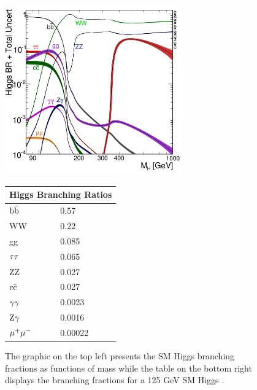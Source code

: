 \begin{figure}[h!]
  \centering
  \includegraphics[width=3in]{images/Higgs_BR.png}
  \begin{tabular}{ |l|l| }
    \hline
    \multicolumn{2}{|c|}{Higgs Branching Ratios} \\
    \hline
    ${\rm b\bar{b}}$ & 0.57 \\
    WW & 0.22\\
    gg & 0.085 \\
    ${\rm \tau\tau}$ & 0.065 \\
    ZZ & 0.027 \\
    ${\rm c\bar{c}}$ & 0.027 \\
    ${\rm \gamma\gamma}$ & 0.0023 \\
    ${\rm Z}\gamma$ & 0.0016 \\
    ${\rm \mu^{+}\mu^{-}}$ & 0.00022 \\
    \hline
  \end{tabular} 
  \caption
{The graphic on the top left presents the SM Higgs branching fractions as functions of mass while the table on the bottom right displays the branching fractions for a 125 GeV SM Higgs \cite{crossbranchplots}.}
  \label{fig:hbranch}
\end{figure}

